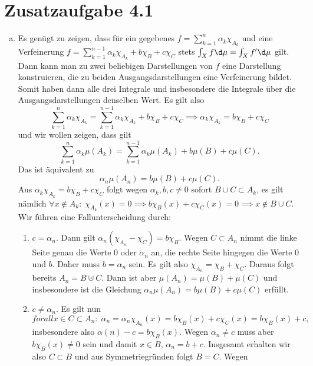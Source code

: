 \documentclass{article}
\begin{document}
    \section*{Zusatzaufgabe 4.1}
    \begin{enumerate}[(a)]
        \item Es genügt zu zeigen, dass für ein gegebenes $f = \sum_{k = 1}^{n} \alpha_k \chi_{A_k}$ und eine Verfeinerung $f = \sum_{k = 1}^{n-1} \alpha_k \chi_{A_k}  + b \chi_B + c\chi_C$ stets $\int_X f \d \mu = \int_X f'\d \mu$ gilt. Dann kann man zu zwei beliebigen Darstellungen von $f$ eine Darstellung konstruieren, die zu beiden Ausgangsdarstellungen eine Verfeinerung bildet. Somit haben dann alle drei Integrale und insbesondere die Integrale über die Ausgangsdarstellungen denselben Wert.
        Es gilt also 
        \[
            \sum_{k = 1}^{n} \alpha_k \chi_{A_k} = \sum_{k = 1}^{n-1} \alpha_k \chi_{A_k} + b \chi_B + c\chi_C \implies \alpha_k \chi_{A_k} = b \chi_B + c \chi_C
        \]
        und wir wollen zeigen, dass gilt
        \[
            \sum_{k = 1}^{n} \alpha_k \mu(A_k) = \sum_{k = 1}^{n-1} \alpha_k\mu(A_k) + b \mu(B) + c \mu(C).
        \]
        Das ist äquivalent zu
        \[
            \alpha_n \mu(A_n) = b \mu(B) + c \mu(C).
        \]
        Aus $\alpha_k \chi_{A_k} = b \chi_B + c \chi_C$ folgt wegen $\alpha_k, b, c \neq 0$ sofort $B \cup C \subset A_k$, es gilt nämlich $\forall x \notin A_k\colon \; \chi_{A_k}(x) = 0 \implies b \chi_B(x) + c \chi_C(x) = 0 \implies x \notin B\cup C$.
        Wir führen eine Fallunterscheidung durch:
        \begin{enumerate}[1.]
            \item $c = \alpha_n$. Dann gilt $\alpha_n(\chi_{A_n} - \chi_{C}) = b \chi_B$. Wegen $C \subset A_n$ nimmt die linke Seite genau die Werte $0$ oder $\alpha_n$ an, die rechte Seite hingegen die Werte $0$ und $b$. Daher muss $b = \alpha_n$ sein. Es gilt also $\chi_{A_n} = \chi_B + \chi_C$. Daraus folgt bereits $A_n = B \uplus C$. Dann ist aber $\mu(A_n) = \mu(B) + \mu(C)$ und insbesondere ist die Gleichung $\alpha_n \mu(A_n) = b \mu(B) + c\mu(C)$ erfüllt.
            \item $c \neq \alpha_n$. Es gilt nun 
            \[
                forall x \in C\subset A_n\colon\; \alpha_n = \alpha_n \chi_{A_n}(x) = b \chi_B(x) + c \chi_C(x) = b \chi_B(x) + c,
            \]
            insbesondere also $\alpha(n) - c = b \chi_B(x)$. Wegen $\alpha_n \neq c$ muss aber $b \chi_B(x) \neq 0$ sein und damit $x \in B$, $\alpha_n = b + c$. Insgesamt erhalten wir also $C \subset B$ und aus Symmetriegründen folgt $B = C$. Wegen 

\end{enumerate}
\end{enumerate}
\end{document}
